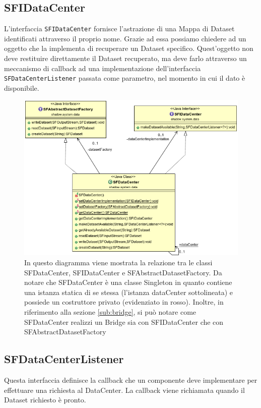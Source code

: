 \subsection{SFIDataCenter}
\label{sub:sfidatacenter}
L'interfaccia \texttt{SFIDataCenter} fornisce l'astrazione di una Mappa di Dataset identificati attraverso il proprio nome.
Grazie ad essa possiamo chiedere ad un oggetto che la implementa di recuperare un Dataset specifico.
Quest'oggetto non deve restituire direttamente il Dataset recuperato, ma deve farlo attraverso un meccanismo di callback ad una implementazione dell'interfaccia \texttt{SFDataCenterListener} passata come parametro, nel momento in cui il dato \`e disponibile.

\begin{figure}
\begin{center}
\includegraphics[width=\textwidth]{Immagini/DataCenterBridge}
\caption[Relazione tra le classi del bridge SFDataCenter.]{In questo diagramma viene mostrata la relazione tra le classi SFDataCenter, SFIDataCenter e SFAbstractDatasetFactory. Da notare che SFDataCenter \`e una classe Singleton in quanto contiene una istanza statica di se stessa (l'istanza dataCenter sottolineata) e possiede un costruttore privato (evidenziato in rosso). Inoltre, in riferimento alla sezione \ref{sub:bridge}, si pu\`o notare come SFDataCenter realizzi un Bridge sia con SFIDataCenter che con SFAbstractDatasetFactory \label{f:datacenterbridge}} 
\end{center} 
\end{figure}

\subsection{SFDataCenterListener}
\label{sub:sfdatacenterlistener}
Questa interfaccia definisce la callback che un componente deve implementare per effettuare una richiesta al DataCenter.
La callback viene richiamata quando il Dataset richiesto \`e pronto.

